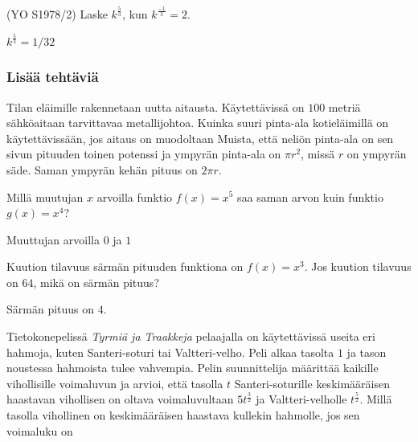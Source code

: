 \begin{tehtavasivu}
\begin{tehtava}
(YO S1978/2) Laske $k^\frac{5}{3}$, kun $k^\frac{-1}{3}=2$. \\
	\begin{vastaus}
		$k^\frac{5}{3}=1/32$
	\end{vastaus}
\end{tehtava}

\subsubsection*{Lisää tehtäviä}

\begin{tehtava}%
Tilan eläimille rakennetaan uutta aitausta. Käytettävissä on $100$ metriä sähköaitaan tarvittavaa metallijohtoa. Kuinka suuri pinta-ala kotieläimillä on käytettävissään, jos aitaus on muodoltaan
Muista, että neliön pinta-ala on sen sivun pituuden toinen potenssi ja ympyrän pinta-ala on $\pi r^2$, missä $r$ on ympyrän säde. Saman ympyrän kehän pituus on $2\pi r$.
\begin{vastaus}
\end{vastaus}
\end{tehtava}

\begin{tehtava}
Millä muutujan $x$ arvoilla funktio $ f(x)=x^5$ saa saman arvon kuin funktio $ g(x)=x^4$?
\begin{vastaus}
Muuttujan arvoilla $0$ ja $1$
\end{vastaus}
\end{tehtava}

\begin{tehtava}
Kuution tilavuus särmän pituuden funktiona on $f(x) = x^3$. Jos kuution tilavuus on $64$, mikä on särmän pituus?
\begin{vastaus}
Särmän pituus on $4$.
\end{vastaus}
\end{tehtava}

\begin{tehtava}
Tietokonepelissä \emph{Tyrmiä ja Traakkeja} pelaajalla on käytettävissä useita eri hahmoja, kuten Santeri-soturi tai Valtteri-velho. Peli alkaa tasolta $1$ ja tason noustessa hahmoista tulee vahvempia. Pelin suunnittelija määrittää kaikille vihollisille voimaluvun ja arvioi, että tasolla $t$ Santeri-soturille keskimääräisen haastavan vihollisen on oltava voimaluvultaan $5t^{\frac{3}{2}}$ ja Valtteri-velholle $t^{\frac{5}{2}}$. Millä tasolla vihollinen on keskimääräisen haastava kullekin hahmolle, jos sen voimaluku on
\begin{vastaus}
\end{vastaus}
\end{tehtava}


\end{tehtavasivu}

